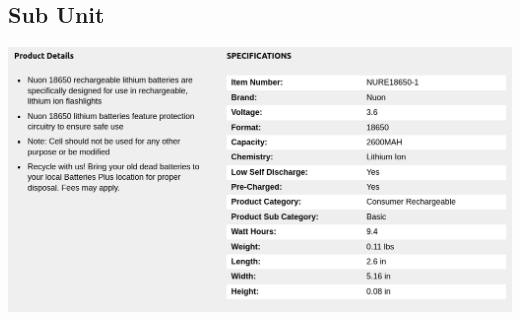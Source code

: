 \documentclass[12pt]{article}
\begin{document}
\subsection{Sub Unit}
\includegraphics[width=\textwidth]{../Appendix/Figures/Sub-Unit/ 5-May-2023-13-05.png}












\end{document}
